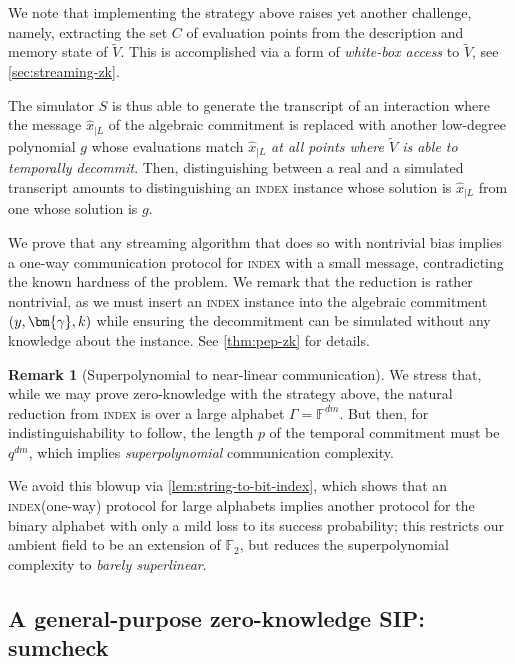 \documentclass[10pt,a4paper]{article}
\theoremstyle{definition}
\newtheorem{remark}[theorem]{Remark}
\newcommand{\field}{\mathbb{F}}
\newcommand{\indexproblem}{\normalfont\textsc{index}\xspace}
\newcommand{\pcommitlength}{p}
\newcommand{\pcommitstring}{y}
\newcommand{\dimension}{m}
\newcommand{\degree}{d}
\newcommand{\fieldsize}{q}
\renewcommand{\line}{L}
\newcommand{\alphabet}{\Gamma}
\def\fe#1{
    \ifnum#1=1
        \alpha
    \else
    \ifnum#1=2
        \beta
    \else
    \ifnum#1=3
        \gamma
    \fi\fi\fi
}
\begin{document}
    We note that implementing the strategy above raises yet another challenge, namely, extracting the set $C$ of evaluation points from the description and memory state of $\widetilde V$. This is accomplished via a form of \emph{white-box access} to $\widetilde V$, see \cref{sec:streaming-zk}.
    
     The simulator $S$ is thus able to generate the transcript of an interaction where the message $\hat x_{|\line}$ of the algebraic commitment is replaced with another low-degree polynomial $g$ whose evaluations match $\hat x_{|\line}$ \emph{at all points where $\widetilde V$ is able to temporally decommit}. Then, distinguishing between a real and a simulated transcript amounts to distinguishing an \indexproblem instance whose solution is $\hat x_{|\line}$ from one whose solution is $g$.
     
     We prove that any streaming algorithm that does so with nontrivial bias implies a one-way communication protocol for \indexproblem with a small message, contradicting the known hardness of the problem. We remark that the reduction is rather nontrivial, as we must insert an \indexproblem instance into the algebraic commitment $(\pcommitstring, \bm{\fe3}, k)$ while ensuring the decommitment can be simulated without any knowledge about the instance. See \cref{thm:pep-zk} for details.
     
     \begin{remark}[Superpolynomial to near-linear communication]
         We stress that, while we may prove zero-knowledge with the strategy above, the natural reduction from \indexproblem is over a large alphabet $\alphabet = \field^{\degree\dimension}$. But then, for indistinguishability to follow, the length $\pcommitlength$ of the temporal commitment must be $\fieldsize^{\degree\dimension}$, which implies \emph{superpolynomial} communication complexity.
         
         We avoid this blowup via \cref{lem:string-to-bit-index}, which shows that an \indexproblem (one-way) protocol for large alphabets implies another protocol for the binary alphabet with only a mild loss to its success probability; this restricts our ambient field to be an extension of $\field_2$, but reduces the superpolynomial complexity to \emph{barely superlinear}.
     \end{remark}
     
    
\subsection{A general-purpose zero-knowledge SIP: sumcheck}
\label{sec-to:sumcheck}
\end{document}
